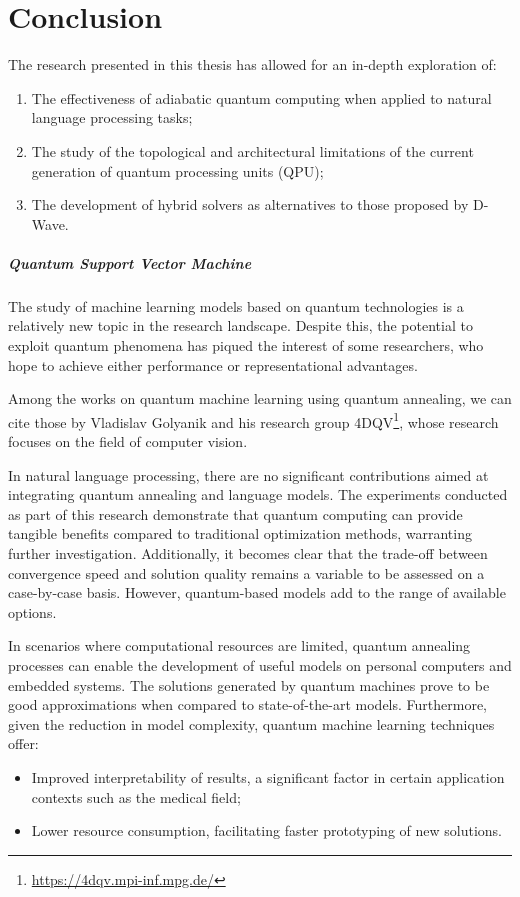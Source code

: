 \chapter{Conclusion}

The research presented in this thesis has allowed for an in-depth exploration of:
\begin{enumerate}
    \item The effectiveness of adiabatic quantum computing when applied to natural language processing tasks;
    \item The study of the topological and architectural limitations of the current generation of quantum processing units (QPU);
    \item The development of hybrid solvers as alternatives to those proposed by D-Wave.
\end{enumerate}

\paragraph{Quantum Support Vector Machine} The study of machine learning models based on quantum technologies is a relatively new topic in the research landscape. 
Despite this, the potential to exploit quantum phenomena has piqued the interest of some researchers, who hope to achieve either performance or representational advantages.

Among the works on quantum machine learning using quantum annealing, we can cite those by Vladislav Golyanik and his research group 4DQV\footnote{\url{https://4dqv.mpi-inf.mpg.de/}}, whose research focuses on the field of computer vision\cite{qcv1}\cite{qcv2}.

In natural language processing, there are no significant contributions aimed at integrating quantum annealing and language models. 
The experiments conducted as part of this research demonstrate that quantum computing can provide tangible benefits compared to traditional optimization methods, warranting further investigation. 
Additionally, it becomes clear that the trade-off between convergence speed and solution quality remains a variable to be assessed on a case-by-case basis. 
However, quantum-based models add to the range of available options.

In scenarios where computational resources are limited, quantum annealing processes can enable the development of useful models on personal computers and embedded systems. 
The solutions generated by quantum machines prove to be good approximations when compared to state-of-the-art models. 
Furthermore, given the reduction in model complexity, quantum machine learning techniques offer:
\begin{itemize}
    \item Improved interpretability of results, a significant factor in certain application contexts such as the medical field;
    \item Lower resource consumption, facilitating faster prototyping of new solutions.
\end{itemize}

